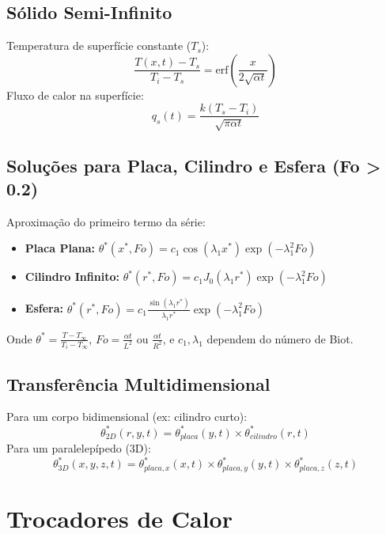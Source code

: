 \documentclass[12pt, a4paper]{article}
\begin{document}
\subsection{Sólido Semi-Infinito}
Temperatura de superfície constante ($T_s$):
\begin{equation}
    \frac{T(x,t) - T_s}{T_i - T_s} = \text{erf}\left(\frac{x}{2\sqrt{\alpha t}}\right)
\end{equation}
Fluxo de calor na superfície:
\begin{equation}
    q_s(t) = \frac{k(T_s - T_i)}{\sqrt{\pi \alpha t}}
\end{equation}

\subsection{Soluções para Placa, Cilindro e Esfera (Fo > 0.2)}
Aproximação do primeiro termo da série:
\begin{itemize}
    \item \textbf{Placa Plana:} $\theta^*(x^*, Fo) = c_1 \cos(\lambda_1 x^*) \exp(-\lambda_1^2 Fo)$
    \item \textbf{Cilindro Infinito:} $\theta^*(r^*, Fo) = c_1 J_0(\lambda_1 r^*) \exp(-\lambda_1^2 Fo)$
    \item \textbf{Esfera:} $\theta^*(r^*, Fo) = c_1 \frac{\sin(\lambda_1 r^*)}{\lambda_1 r^*} \exp(-\lambda_1^2 Fo)$
\end{itemize}
Onde $\theta^* = \frac{T - T_\infty}{T_i - T_\infty}$, $Fo = \frac{\alpha t}{L^2}$ ou $\frac{\alpha t}{R^2}$, e $c_1, \lambda_1$ dependem do número de Biot.

\subsection{Transferência Multidimensional}
Para um corpo bidimensional (ex: cilindro curto):
\begin{equation}
    \theta^*_{2D}(r, y, t) = \theta^*_{placa}(y, t) \times \theta^*_{cilindro}(r, t)
\end{equation}
Para um paralelepípedo (3D):
\begin{equation}
    \theta^*_{3D}(x,y,z,t) = \theta^*_{placa,x}(x,t) \times \theta^*_{placa,y}(y,t) \times \theta^*_{placa,z}(z,t)
\end{equation}

\newpage

\section{Trocadores de Calor}
\end{document}

